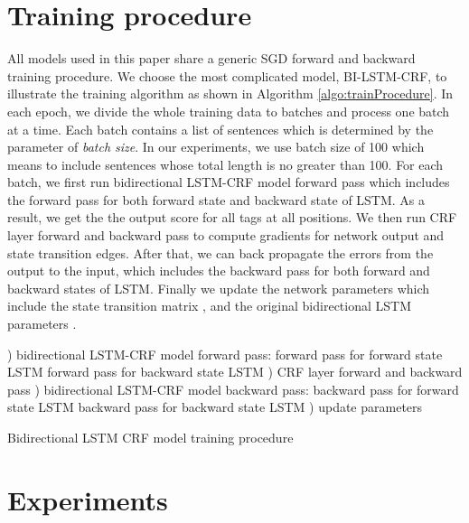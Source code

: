 \documentclass[11pt,a4paper]{article}
\begin{document}
\section{Training procedure} \label{sec:train}
All models used in this paper share a generic SGD forward and backward training procedure. We choose the most complicated model, BI-LSTM-CRF, to illustrate the training algorithm as shown in Algorithm \ref{algo:trainProcedure}.  In each epoch, we divide the whole training data to batches and process one batch at a time. Each batch contains a list of sentences which is determined by the parameter of \textit{batch size}. In our experiments, we use batch size of 100 which means to include sentences whose total length is no greater than 100. For each batch, we first run bidirectional LSTM-CRF model forward pass which includes the forward pass for both forward state and backward state of LSTM. As a result, we get the the output score  for all tags at all positions. We then run CRF layer forward and backward pass to compute gradients for network output and state transition edges. After that, we can back propagate the errors from the output to the input, which includes the backward pass for both forward and backward states of LSTM. Finally we update the network parameters which include the state transition matrix , and the original bidirectional LSTM parameters . 
\begin{algorithm}[!hbt]
\small
\begin{algorithmic}[1]
     ) bidirectional LSTM-CRF model forward pass:
       \STATE\hspace{\algorithmicindent} forward pass for forward state LSTM
       \STATE\hspace{\algorithmicindent} forward pass for backward state LSTM
    ) CRF layer forward and backward pass
    ) bidirectional LSTM-CRF model backward pass:
       \STATE\hspace{\algorithmicindent} backward pass for forward state LSTM
       \STATE\hspace{\algorithmicindent} backward pass for backward state LSTM
    ) update parameters
 \ENDFOR  
\ENDFOR 
\end{algorithmic}
\caption{Bidirectional LSTM CRF model training procedure}\label{algo:trainProcedure}
\end{algorithm}

\section{Experiments} \label{sec:experiment}
\end{document}
